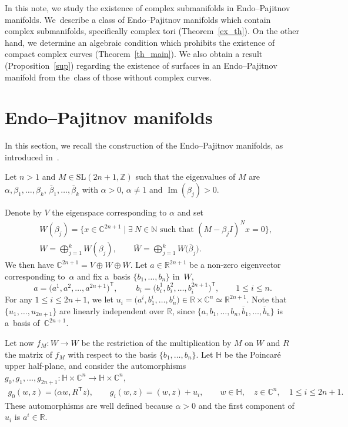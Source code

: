 \documentclass[10pt,a4paper]{amsart}
\newcommand{\C}{{\mathbb C}}
\newcommand{\R}{{\mathbb R}}
\newcommand{\6}{\partial}
\renewcommand{\Im}{\operatorname{Im}}
\numberwithin{equation}{section}
\begin{document}
 In this note, we study the existence of complex submanifolds in Endo--Pajitnov manifolds. We~describe a class of Endo--Pajitnov manifolds which contain complex submanifolds, specifically complex tori (Theorem~\ref{ex_th}). On the other hand, we determine an algebraic condition which prohibits the existence of compact complex curves (Theorem~\ref{th_main}). We also obtain a result (Proposition~\ref{sup}) regarding the existence of surfaces in an Endo--Pajitnov manifold from the~class of those without complex curves.

\section{Endo--Pajitnov manifolds}
\label{EP_def_sec}

In this section, we recall the construction of the Endo--Pajitnov manifolds, as introduced in~\cite{pajitnov1}.

Let $n > 1$ and $M \in \textrm{SL}(2n+1, \mathbb{Z})$ such that the eigenvalues of $M$ are $\alpha, \beta_1, \dots, \beta_k$, $\overline{\beta}_1, \dots, \overline{\beta}_k$ with $\alpha>0$, $\alpha \neq 1$ and $\Im(\beta_j)>0$.

Denote by $V$ the eigenspace corresponding to $\alpha$ and set
\begin{equation*}
	\begin{split}
		&W(\beta_j)=\bigl\{x \in \mathbb{C}^{2n+1}\mid \exists \ N \in \mathbb{N} \text{ such that } (M-\beta_j I)^Nx=0\bigr\},\\
	 &W=\bigoplus \limits_{j=1}^{k} W(\beta_j),\qquad \overline{W}=\bigoplus\limits_{j=1}^{k} W\big(\overline{\beta}_j\big).
	\end{split}
\end{equation*}
We then have $\mathbb{C}^{2n+1}=V \oplus W \oplus \overline{W}$.
Let $a \in \R^{2n+1}$ be a non-zero eigenvector corresponding to~$\alpha$ and fix a~basis $\{b_1, \dots, b_n\}$ in~$W$,
\[
a=\big(a^1, a^2, \dots, a^{2n+1}\big)^{\mathsf{T}},\qquad \ b_i=\big( b_{i}^1, b_{i}^2, \dots, b_{i}^{2n+1}\big)^{\mathsf{T}}, \qquad 1 \leq i\leq n.
\]
For any $1 \le i \le 2n + 1$, we let $u_i = \big(a^i, b_1^i, \dots , b_n^i\big) \in \R \times \C^n \simeq \R^{2n+1}$.
Note that $\{u_1, \dots , u_{2n+1} \}$ are linearly independent over $\R$, since $\bigl\{a, b_1, \dots, b_n, \overline{b}_1, \dots, \overline{b}_n\bigr\}$ is a~basis of~$\mathbb{C}^{2n+1}$.

Let now $f_M\colon W \longrightarrow W$ be the restriction of the multiplication by $M$ on $W$ and $R$ the matrix of $f_M$ with respect to the basis $\{b_1, \dots , b_n\}$. Let $\mathbb{H}$ be the Poincar\'e upper half-plane, and consider the automorphisms $g_0, g_1, \dots, g_{2n+1}\colon \mathbb{H} \times \mathbb{C}^n \longrightarrow \mathbb{H} \times \mathbb{C}^n$,
\begin{gather*}
 g_0(w,z)=\big(\alpha w, R^{\mathsf{T}}z\big), \qquad g_i(w,z)=(w,z)+u_i,\qquad w \in \mathbb{H}, \quad z \in \mathbb{C}^n,\quad 1 \leq i \leq 2n+1.
\end{gather*}
These automorphisms are well defined because $\alpha > 0$ and the first component of $u_i$ is $a^i \in \R$.
\end{document}
